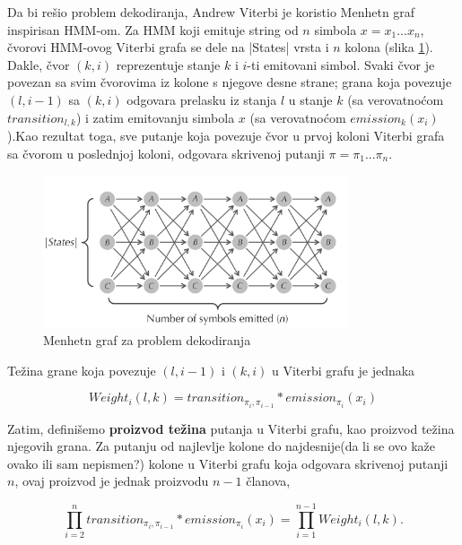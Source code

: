Da bi rešio problem dekodiranja, Andrew Viterbi je koristio Menhetn graf inspirisan HMM-om. Za HMM koji emituje string od $ n $ simbola $ x = x_1...x_n $, čvorovi HMM-ovog Viterbi grafa se dele na |States| vrsta i $ n $ kolona (slika \ref{slika: menhetn}). Dakle, čvor $ (k, i) $ reprezentuje stanje $ k $ i $ i $-ti emitovani simbol. Svaki čvor je povezan sa svim čvorovima iz kolone s njegove desne strane; grana koja povezuje $  (l, i-1) $ sa $ (k, i) $ odgovara prelasku iz stanja $ l $ u stanje $ k $ (sa verovatnoćom $ transition_{l, k}$) i zatim emitovanju simbola $ x $ (sa verovatnoćom $ emission_k(x_i)$).Kao rezultat toga, sve putanje koja povezuje čvor u prvoj koloni Viterbi grafa sa čvorom u poslednjoj koloni, odgovara skrivenoj putanji $ \pi = \pi_1...\pi_n$.

\begin{figure}[H]
\centering
\includegraphics[width=0.8\textwidth]{poglavlja/10/slike/Menhetn_graf.png}
\caption{Menhetn graf za problem dekodiranja}
\label{slika: menhetn}
\end{figure}



Težina grane koja povezuje $ (l, i-1) $ i $ (k, i) $ u Viterbi grafu je jednaka

\begin{equation}
    Weight_i(l, k) = transition_{\pi_i, \pi_{i-1}}*emission_{\pi_i}(x_i)
\end{equation}

Zatim, definišemo \textbf{proizvod težina} putanja u Viterbi grafu, kao proizvod težina njegovih grana. Za putanju od najlevlje kolone do najdesnije(da li se ovo kaže ovako ili sam nepismen?) kolone u Viterbi grafu koja odgovara skrivenoj putanji $ n $, ovaj proizvod je jednak proizvodu $ n-1 $ članova,

\begin{equation}
{\displaystyle \prod_{i=2}^n transition_{\pi_i, \pi_{i-1}}*emission_{\pi_i}(x_i)} = {\displaystyle \prod_{i=1}^{n-1}  Weight_i(l, k)}.
\end{equation}

